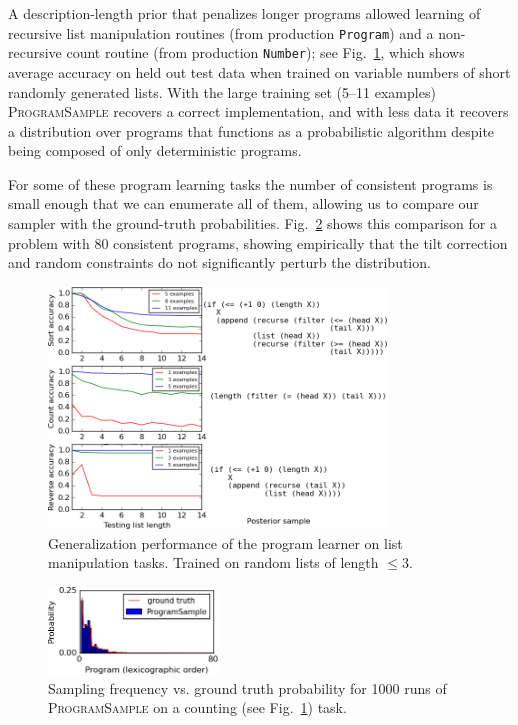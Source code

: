 \documentclass{article}
\newcommand{\theSystem}{\textsc{ProgramSample}}
\begin{document}
A description-length prior that penalizes longer programs allowed learning of recursive list manipulation routines (from production \verb|Program|) and a non-recursive count routine (from production \verb|Number|); see Fig.~\ref{listCurves},
which shows average accuracy on held out test data when trained on variable numbers of short randomly generated lists.
With the large training set (5--11 examples) \theSystem{} recovers a correct implementation,
and with less data it recovers a distribution over programs
that functions as a probabilistic algorithm despite being composed of only deterministic programs.

For some of these program learning tasks the number of consistent programs is small enough that we can enumerate all of them, allowing us to compare our sampler with the ground-truth probabilities.
Fig.~\ref{marginal} shows this comparison for a problem with 80 consistent programs, showing empirically that the tilt correction and random constraints do not significantly perturb the distribution.
\begin{figure}
  \includegraphics[width=0.8\textwidth]{smallList.png}
  \caption{Generalization performance of the program learner on list manipulation tasks. Trained on random lists of length $\leq 3$.}
  \label{listCurves}
\end{figure}
\begin{figure}
  \includegraphics[width=0.4\textwidth]{small_probabilityPlot.png}
  \caption{Sampling frequency vs. ground truth probability for 1000 runs of \theSystem{} on a counting (see Fig.~\ref{listCurves}) task.}
  \label{marginal}
  \end{figure}
\end{document}
